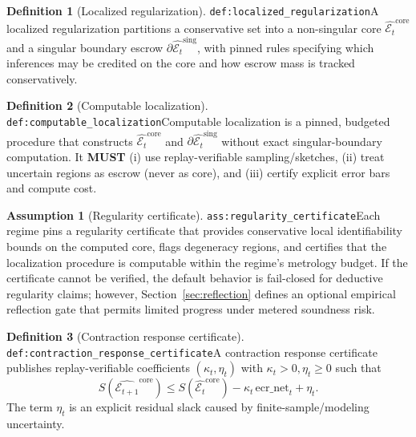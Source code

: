 \documentclass[11pt]{article}
\theoremstyle{definition}
\newtheorem{definition}{Definition}
\newtheorem{assumption}{Assumption}
\theoremstyle{plain}
\newcommand{\MUST}{\textbf{MUST}}
\newcommand{\lbl}[1]{\texttt{\footnotesize\nolinkurl{#1}}}
\newcommand{\DefLabel}[1]{\hfill{\small\lbl{#1}}}
\newcommand{\Et}{\mathcal{E}_t}
\begin{document}
\begin{definition}[Localized regularization]\DefLabel{def:localized_regularization}\label{def:localized_regularization}
A localized regularization partitions a conservative set into a non-singular core $\widehat{\Et}^{\mathrm{core}}$ and a singular boundary escrow $\partial\widehat{\Et}^{\mathrm{sing}}$, with pinned rules specifying which inferences may be credited on the core and how escrow mass is tracked conservatively.
\end{definition}

\begin{definition}[Computable localization]\DefLabel{def:computable_localization}\label{def:computable_localization}
Computable localization is a pinned, budgeted procedure that constructs $\widehat{\Et}^{\mathrm{core}}$ and $\partial\widehat{\Et}^{\mathrm{sing}}$ without exact singular-boundary computation.
It \MUST{} (i) use replay-verifiable sampling/sketches, (ii) treat uncertain regions as escrow (never as core), and (iii) certify explicit error bars and compute cost.
\end{definition}

\begin{assumption}[Regularity certificate]\DefLabel{ass:regularity_certificate}\label{ass:regularity_certificate}
Each regime pins a regularity certificate that provides conservative local identifiability bounds on the computed core, flags degeneracy regions, and certifies that the localization procedure is computable within the regime's metrology budget.
If the certificate cannot be verified, the default behavior is fail-closed for deductive regularity claims; however, Section~\ref{sec:reflection} defines an optional empirical reflection gate that permits limited progress under metered soundness risk.
\end{assumption}

\begin{definition}[Contraction response certificate]\DefLabel{def:contraction_response_certificate}\label{def:contraction_response_certificate}
A contraction response certificate publishes replay-verifiable coefficients $(\kappa_t,\eta_t)$ with $\kappa_t>0,\eta_t\ge 0$ such that
\[
S\!\left(\widehat{\mathcal{E}_{t+1}}^{\mathrm{core}}\right)
\le
S\!\left(\widehat{\mathcal{E}_{t}}^{\mathrm{core}}\right)-\kappa_t\,\mathrm{ecr\_net}_t+\eta_t.
\]
The term $\eta_t$ is an explicit residual slack caused by finite-sample/modeling uncertainty.
\end{definition}
\end{document}
